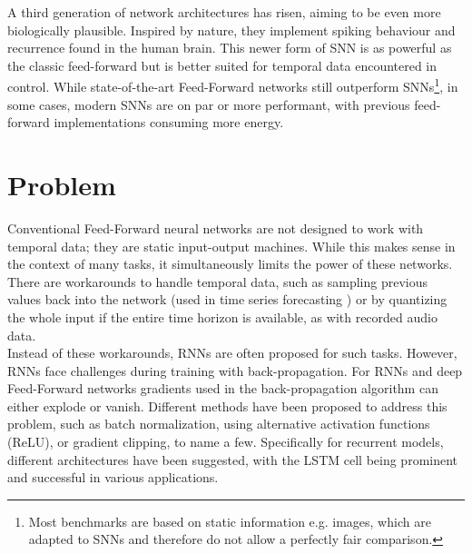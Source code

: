 A third generation\cite{maass_networks_1997} of network architectures has risen, aiming to be even more biologically plausible. Inspired by nature, they implement spiking behaviour and recurrence found in the human brain. This newer form of \ac{SNN} is as powerful as the classic feed-forward but is better suited for temporal data encountered in control. While state-of-the-art Feed-Forward networks still outperform \acp{SNN}\footnote{Most benchmarks are based on static information e.g. images, which are adapted to \acp{SNN} and therefore do not allow a perfectly fair comparison.}, in some cases, modern \acp{SNN} are on par\cite{lee_training_2016} or more performant, with previous feed-forward implementations consuming more energy.

%

\section{Problem}
Conventional Feed-Forward neural networks are not designed to work with temporal data; they are static input-output machines. While this makes sense in the context of many tasks, it simultaneously limits the power of these networks. There are workarounds to handle temporal data, such as sampling previous values back into the network (used in time series forecasting \cite{tang_feedforward_1993,yang_cascade_2022,uncini_audio_2003}) or by quantizing the whole input if the entire time horizon is available, as with recorded audio data.\\
Instead of these workarounds, \acp{RNN} are often proposed for such tasks. However, \acp{RNN} face challenges during training with back-propagation\cite{bengio_learning_1994}. For \acp{RNN} and deep Feed-Forward networks gradients used in the back-propagation algorithm can either explode or vanish. Different methods have been proposed to address this problem, such as batch normalization\cite{ioffe_batch_2015}, using alternative activation functions (ReLU)\cite{nair_rectified_2010}, or gradient clipping\cite{pascanu_difficulty_2013}, to name a few. Specifically for recurrent models, different architectures have been suggested, with the \ac{LSTM} cell \cite{hochreiter_long_1997} being prominent and successful in various applications\cite{mayer_system_2006, sak_long_2014, li_constructing_2015}.\\


